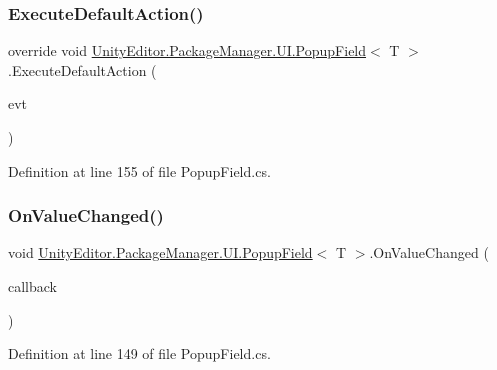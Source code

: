\subsubsection{\texorpdfstring{ExecuteDefaultAction()}{ExecuteDefaultAction()}}
{\footnotesize\ttfamily override void \mbox{\hyperlink{class_unity_editor_1_1_package_manager_1_1_u_i_1_1_popup_field}{Unity\+Editor.\+Package\+Manager.\+U\+I.\+Popup\+Field}}$<$ T $>$.Execute\+Default\+Action (\begin{DoxyParamCaption}\item[{Event\+Base}]{evt }\end{DoxyParamCaption})\hspace{0.3cm}{\ttfamily [protected]}}



Definition at line 155 of file Popup\+Field.\+cs.

\mbox{\label{class_unity_editor_1_1_package_manager_1_1_u_i_1_1_popup_field_a805375871c4f16bb18d81e28923fe7ca}} 
\subsubsection{\texorpdfstring{OnValueChanged()}{OnValueChanged()}}
{\footnotesize\ttfamily void \mbox{\hyperlink{class_unity_editor_1_1_package_manager_1_1_u_i_1_1_popup_field}{Unity\+Editor.\+Package\+Manager.\+U\+I.\+Popup\+Field}}$<$ T $>$.On\+Value\+Changed (\begin{DoxyParamCaption}\item[{Event\+Callback$<$ Change\+Event$<$ T $>$$>$}]{callback }\end{DoxyParamCaption})}



Definition at line 149 of file Popup\+Field.\+cs.

\mbox{\label{class_unity_editor_1_1_package_manager_1_1_u_i_1_1_popup_field_a9abe30176e465f59b1fa19c914fd9e64}} 
